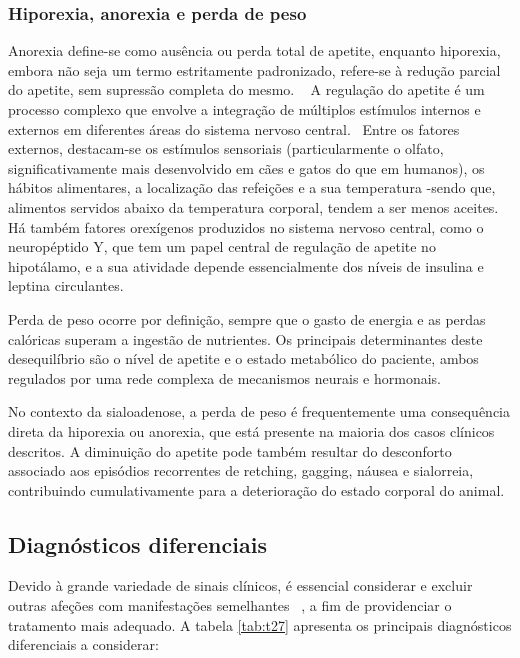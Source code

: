 \subsubsection{Hiporexia, anorexia e perda de peso}

Anorexia define-se como ausência ou perda total de apetite, enquanto hiporexia, embora não seja um termo estritamente padronizado, refere-se à redução parcial do apetite, sem supressão completa do mesmo. ~\cite{Delaney2006}
A regulação do apetite é um processo complexo que envolve a integração de múltiplos estímulos internos e externos em diferentes áreas do sistema nervoso central. ~\cite{canine_gastro_2013}Entre os fatores externos, destacam-se os estímulos sensoriais (particularmente o olfato, significativamente mais desenvolvido em cães e gatos do que em humanos), os hábitos alimentares, a localização das refeições e a sua temperatura -sendo que, alimentos servidos abaixo da temperatura corporal, tendem a ser menos aceites. ~\cite{canine_gastro_2013}
Há também fatores orexígenos produzidos no sistema nervoso central, como o neuropéptido Y, que tem um papel central de regulação de apetite no hipotálamo, e a sua atividade depende essencialmente dos níveis de insulina e leptina circulantes. ~\cite{canine_gastro_2013}


Perda de peso ocorre por definição, sempre que o gasto de energia e as perdas calóricas superam a ingestão de nutrientes. Os principais determinantes deste desequilíbrio são o nível de apetite e o estado metabólico do paciente, ambos regulados por uma rede complexa de mecanismos neurais e hormonais. ~\cite{canine_gastro_2013}


No contexto da sialoadenose, a perda de peso é frequentemente uma consequência direta da hiporexia ou anorexia, que está presente na maioria dos casos clínicos descritos. A diminuição do apetite pode também resultar do desconforto associado aos episódios recorrentes de retching, gagging, náusea e sialorreia, contribuindo cumulativamente para a deterioração do estado corporal do animal.

\subsection{Diagnósticos diferenciais}

Devido à grande variedade de sinais clínicos, é essencial considerar e excluir outras afeções com manifestações semelhantes ~\cite{Han2016}, a fim de providenciar o tratamento mais adequado. A tabela \ref{tab:t27} apresenta os principais diagnósticos diferenciais a considerar:

